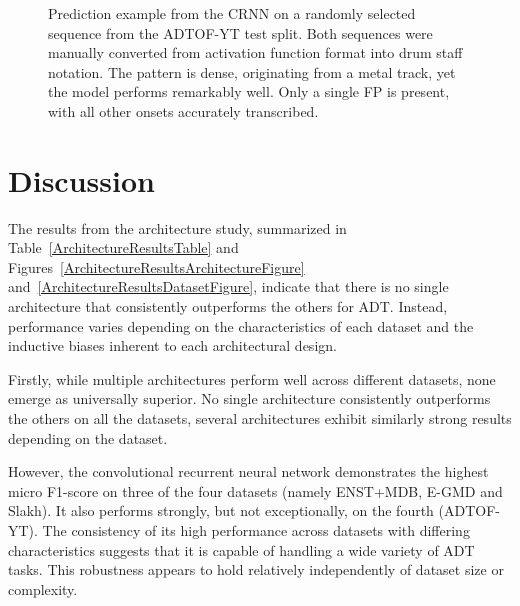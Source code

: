 \begin{figure}[H]
    \centering
    \caption{Prediction example from the \acrfull{CRNN} on a randomly selected sequence from the ADTOF-YT test split. Both sequences were manually converted from activation function format into drum staff notation. The pattern is dense, originating from a metal track, yet the model performs remarkably well. Only a single \acrfull{FP} is present, with all other onsets accurately transcribed.}
    \label{ArchitecturePredictionComparisonADTOF-YTFigure}
\end{figure}

\section{Discussion}

The results from the architecture study, summarized in Table~\ref{ArchitectureResultsTable} and Figures~\ref{ArchitectureResultsArchitectureFigure} and~\ref{ArchitectureResultsDatasetFigure}, indicate that there is no single architecture that consistently outperforms the others for \gls{ADT}. Instead, performance varies depending on the characteristics of each dataset and the inductive biases inherent to each architectural design.

Firstly, while multiple architectures perform well across different datasets, none emerge as universally superior. No single architecture consistently outperforms the others on all the datasets, several architectures exhibit similarly strong results depending on the dataset. 

However, the convolutional recurrent neural network demonstrates the highest micro F1-score on three of the four datasets (namely ENST+MDB, E-GMD and Slakh). It also performs strongly, but not exceptionally, on the fourth (ADTOF-YT). The consistency of its high performance across datasets with differing characteristics suggests that it is capable of handling a wide variety of \gls{ADT} tasks. This robustness appears to hold relatively independently of dataset size or complexity. 

